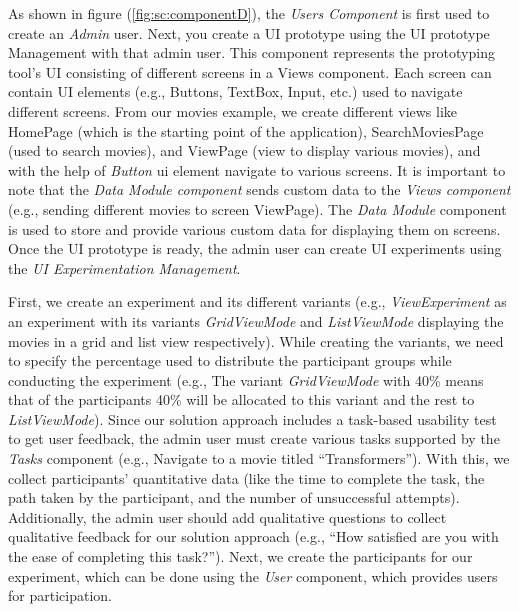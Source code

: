 As shown in figure (\ref{fig:sc:componentD}), the \textit{Users Component} is first used to create an \textit{Admin} user. 
Next, you create a UI prototype using the UI prototype Management with that admin user. 
This component represents the prototyping tool's UI consisting of different screens in a Views component. 
Each screen can contain UI elements (e.g., Buttons, TextBox, Input, etc.) used to navigate different screens.
From our movies example, we create different views like HomePage (which is the starting point of the application), SearchMoviesPage (used to search movies), and ViewPage (view to display various movies), and with the help of \textit{Button} \ac{ui} element navigate to various screens.
It is important to note that the \textit{Data Module component} sends custom data to the \textit{Views component} (e.g., sending different movies to screen ViewPage).
The \textit{Data Module} component is used to store and provide various custom data for displaying them on screens.
Once the UI prototype is ready, the admin user can create UI experiments using the \textit{UI Experimentation Management}.

First, we create an experiment and its different variants (e.g., \textit{ViewExperiment} as an experiment with its variants \textit{GridViewMode} and \textit{ListViewMode} displaying the movies in a grid and list view respectively). 
While creating the variants, we need to specify the percentage used to distribute the participant groups while conducting the experiment (e.g., The variant \textit{GridViewMode} with 40\% means that of the participants 40\% will be allocated to this variant and the rest to \textit{ListViewMode}).
Since our solution approach includes a task-based usability test to get user feedback, the admin user must create various tasks supported by the \textit{Tasks} component (e.g., Navigate to a movie titled ``Transformers'').
With this, we collect participants' quantitative data (like the time to complete the task, the path taken by the participant, and the number of unsuccessful attempts). 
Additionally, the admin user should add qualitative questions to collect qualitative feedback for our solution approach (e.g., ``How satisfied are you with the ease of completing this task?'').
Next, we create the participants for our experiment, which can be done using the \textit{User} component, which provides users for participation.


